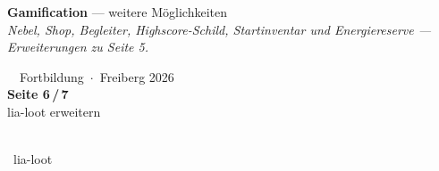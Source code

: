 \documentclass[a4paper,landscape,9pt]{extarticle}
\begin{document}
\noindent\begin{tcolorbox}[
  enhanced, frame hidden, sharp corners,
  colback=lootteal, coltext=white,
  left=12pt, right=8pt, top=4pt, bottom=4pt,
  before skip=0pt, after skip=4pt,
  width=\linewidth, borderline west={4pt}{-4pt}{lootteal!55}
]
\begin{minipage}[c]{0.66\linewidth}
  {\sffamily\fontsize{26}{28}\selectfont\bfseries Gamification}\hspace{0.4em}%
  {\sffamily\large\color{white!75} — weitere Möglichkeiten}\\[2pt]
  {\sffamily\footnotesize\itshape\color{white!90} Nebel, Shop, Begleiter, Highscore-Schild, Startinventar und Energiereserve — Erweiterungen zu Seite 5.}
\end{minipage}\hfill
\begin{minipage}[c]{0.20\linewidth}\raggedright
  {\sffamily\scriptsize\color{white!85}\faGraduationCap~~Fortbildung~$\cdot$~Freiberg 2026}\\[2pt]
  {\sffamily\bfseries\normalsize Seite 6\,/\,7}\\[1pt]
  {\sffamily\scriptsize\color{white!75} lia-loot erweitern}
\end{minipage}\hfill
\begin{minipage}[c]{0.10\linewidth}\centering
  {\color{black}\colorbox{white}{\hspace{1pt}\hspace{1pt}}}\\[1pt]
  {\sffamily\scriptsize\color{white!90}\faGithub~lia-loot}
\end{minipage}
\end{tcolorbox}
\end{document}

